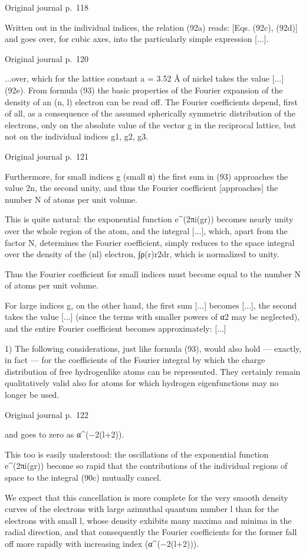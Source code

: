 \documentclass[10pt]{article}
\newcommand{\origpage}[1]{\par\medskip\noindent\hfill{\small\color{notegray}Original journal p.~#1}\hfill\mbox{}\par\smallskip}
\begin{document}
\origpage{118}
Written out in the individual indices, the relation (92a) reads: [Eqs. (92c), (92d)] and goes over, for cubic axes, into the particularly simple expression [...].\par
\origpage{120}
...over, which for the lattice constant a = 3.52 Å of nickel takes the value [...] (92e). From formula (93) the basic properties of the Fourier expansion of the density of an (n, l) electron can be read off. The Fourier coefficients depend, first of all, as a consequence of the assumed spherically symmetric distribution of the electrons, only on the absolute value of the vector g in the reciprocal lattice, but not on the individual indices g1, g2, g3.\par
\origpage{121}
Furthermore, for small indices g (small α) the first sum in (93) approaches the value 2n, the second unity, and thus the Fourier coefficient [approaches] the number N of atoms per unit volume.\par
This is quite natural: the exponential function e\textasciicircum{}(2πi(gr)) becomes nearly unity over the whole region of the atom, and the integral [...], which, apart from the factor N, determines the Fourier coefficient, simply reduces to the space integral over the density of the (nl) electron, ∫ρ(r)r2dr, which is normalized to unity.\par
Thus the Fourier coefficient for small indices must become equal to the number N of atoms per unit volume.\par
For large indices g, on the other hand, the first sum [...] becomes [...], the second takes the value [...] (since the terms with smaller powers of α2 may be neglected), and the entire Fourier coefficient becomes approximately: [...]\par
\noindent\footnotesize 1) The following considerations, just like formula (93), would also hold — exactly, in fact — for the coefficients of the Fourier integral by which the charge distribution of free hydrogenlike atoms can be represented. They certainly remain qualitatively valid also for atoms for which hydrogen eigenfunctions may no longer be used.\par\normalsize
\origpage{122}
and goes to zero as α\textasciicircum{}(−2(l+2)).\par
This too is easily understood: the oscillations of the exponential function e\textasciicircum{}(2πi(gr)) become so rapid that the contributions of the individual regions of space to the integral (90c) mutually cancel.\par
We expect that this cancellation is more complete for the very smooth density curves of the electrons with large azimuthal quantum number l than for the electrons with small l, whose density exhibits many maxima and minima in the radial direction, and that consequently the Fourier coefficients for the former fall off more rapidly with increasing index (α\textasciicircum{}(−2(l+2))).\par
\end{document}
